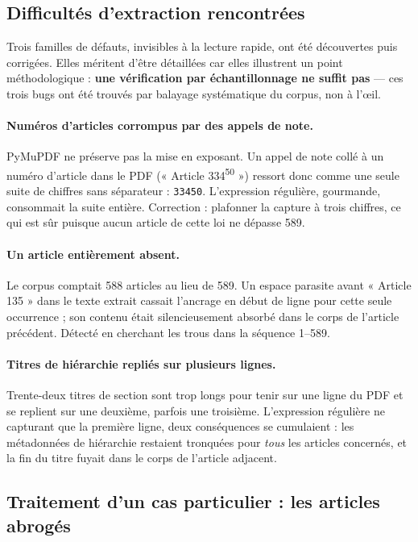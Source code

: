 \subsection{Difficultés d'extraction rencontrées}
\label{sec:bugs}

Trois familles de défauts, invisibles à la lecture rapide, ont été découvertes puis corrigées.
Elles méritent d'être détaillées car elles illustrent un point méthodologique : \textbf{une
vérification par échantillonnage ne suffit pas} --- ces trois bugs ont été trouvés par balayage
systématique du corpus, non à l'œil.

\paragraph{Numéros d'articles corrompus par des appels de note.}
PyMuPDF ne préserve pas la mise en exposant. Un appel de note collé à un numéro d'article dans le
PDF (« Article 334\textsuperscript{50} ») ressort donc comme une seule suite de chiffres sans
séparateur : \texttt{33450}. L'expression régulière, gourmande, consommait la suite entière.
Correction : plafonner la capture à trois chiffres, ce qui est sûr puisque aucun article de cette
loi ne dépasse 589.

\paragraph{Un article entièrement absent.}
Le corpus comptait 588 articles au lieu de 589. Un espace parasite avant « Article 135 » dans le
texte extrait cassait l'ancrage en début de ligne pour cette seule occurrence ; son contenu était
silencieusement absorbé dans le corps de l'article précédent. Détecté en cherchant les trous dans
la séquence 1--589.

\paragraph{Titres de hiérarchie repliés sur plusieurs lignes.}
Trente-deux titres de section sont trop longs pour tenir sur une ligne du PDF et se replient sur
une deuxième, parfois une troisième. L'expression régulière ne capturant que la première ligne,
deux conséquences se cumulaient : les métadonnées de hiérarchie restaient tronquées pour
\emph{tous} les articles concernés, et la fin du titre fuyait dans le corps de l'article adjacent.

\subsection{Traitement d'un cas particulier : les articles abrogés}

